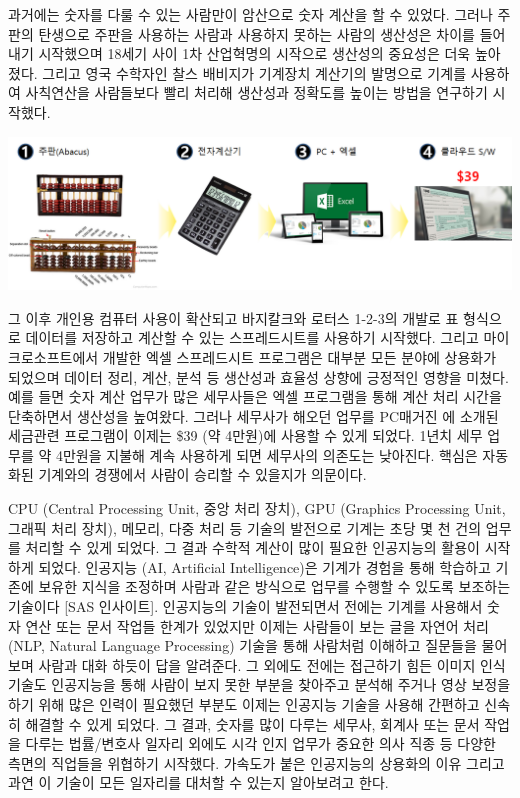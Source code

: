 \documentclass[smallextended]{svjour3}       %
\begin{document}
과거에는 숫자를 다룰 수 있는 사람만이 암산으로 숫자 계산을 할 수 있었다.
그러나 주판의 탄생으로 주판을 사용하는 사람과 사용하지 못하는 사람의
생산성은 차이를 들어내기 시작했으며 18세기 사이 1차 산업혁명의 시작으로
생산성의 중요성은 더욱 높아졌다. 그리고 영국 수학자인 찰스 배비지가
기계장치 계산기의 발명으로 기계를 사용하여 사칙연산을 사람들보다 빨리
처리해 생산성과 정확도를 높이는 방법을 연구하기 시작했다.

\begin{center}\includegraphics[width=1\linewidth]{fig/tax-preparation} \end{center}

그 이후 개인용 컴퓨터 사용이 확산되고 바지칼크와 로터스 1-2-3의 개발로
표 형식으로 데이터를 저장하고 계산할 수 있는 스프레드시트를 사용하기
시작했다. 그리고 마이크로소프트에서 개발한 엑셀 스프레드시트 프로그램은
대부분 모든 분야에 상용화가 되었으며 데이터 정리, 계산, 분석 등 생산성과
효율성 상향에 긍정적인 영향을 미쳤다. 예를 들면 숫자 계산 업무가 많은
세무사들은 엑셀 프로그램을 통해 계산 처리 시간을 단축하면서 생산성을
높여왔다. 그러나 세무사가 해오던 업무를 PC매거진 \cite{yakal_2020}에
소개된 세금관련 프로그램이 이제는 \$39 (약 4만원)에 사용할 수 있게
되었다. 1년치 세무 업무를 약 4만원을 지불해 계속 사용하게 되면 세무사의
의존도는 낮아진다. 핵심은 자동화된 기계와의 경쟁에서 사람이 승리할 수
있을지가 의문이다.

CPU (Central Processing Unit, 중앙 처리 장치), GPU (Graphics Processing
Unit, 그래픽 처리 장치), 메모리, 다중 처리 등 기술의 발전으로 기계는
초당 몇 천 건의 업무를 처리할 수 있게 되었다. 그 결과 수학적 계산이 많이
필요한 인공지능의 활용이 시작하게 되었다. 인공지능 (AI, Artificial
Intelligence)은 기계가 경험을 통해 학습하고 기존에 보유한 지식을
조정하며 사람과 같은 방식으로 업무를 수행할 수 있도록 보조하는 기술이다
{[}SAS 인사이트{]}. 인공지능의 기술이 발전되면서 전에는 기계를 사용해서
숫자 연산 또는 문서 작업들 한계가 있었지만 이제는 사람들이 보는 글을
자연어 처리 (NLP, Natural Language Processing) 기술을 통해 사람처럼
이해하고 질문들을 물어보며 사람과 대화 하듯이 답을 알려준다. 그 외에도
전에는 접근하기 힘든 이미지 인식 기술도 인공지능을 통해 사람이 보지 못한
부분을 찾아주고 분석해 주거나 영상 보정을 하기 위해 많은 인력이 필요했던
부분도 이제는 인공지능 기술을 사용해 간편하고 신속히 해결할 수 있게
되었다. 그 결과, 숫자를 많이 다루는 세무사, 회계사 또는 문서 작업을
다루는 법률/변호사 일자리 외에도 시각 인지 업무가 중요한 의사 직종 등
다양한 측면의 직업들을 위협하기 시작했다. 가속도가 붙은 인공지능의
상용화의 이유 그리고 과연 이 기술이 모든 일자리를 대처할 수 있는지
알아보려고 한다.
\end{document}
